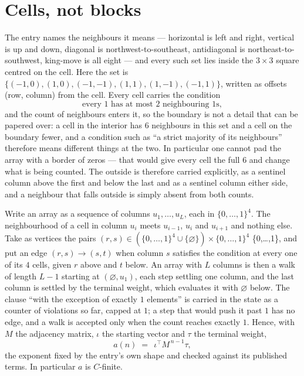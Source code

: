 \documentclass[11pt,a4paper]{article}
\theoremstyle{plain}
\theoremstyle{definition}
\begin{document}
\section{Cells, not blocks}

The entry names the neighbours it means --- horizontal is left and right, vertical is up and
down, diagonal is northwest-to-southeast, antidiagonal is northeast-to-southwest, king-move is
all eight --- and every such set lies inside the $3\times3$ square centred on the cell. Here
the set is $\{(-1,0), (1,0), (-1,-1), (1,1), (1,-1), (-1,1)\}$, written as offsets (row, column) from the cell. Every cell carries
the condition
\[
\text{every 1 has at most 2 neighbouring 1s},
\]
and the count of neighbours enters it, so the boundary is not a detail that can be papered
over: a cell in the interior has $6$ neighbours in this set and a cell on the boundary
fewer, and a condition such as ``a strict majority of its neighbours'' therefore means
different things at the two. In particular one cannot pad the array with a border of zeros ---
that would give every cell the full $6$ and change what is being counted. The outside is
therefore carried
explicitly, as a sentinel column above the first and below the last and as a sentinel column
either side, and a neighbour that falls outside is simply absent from both counts.

Write an array as a sequence of columns $u_1,\dots,u_L$, each in
$\{0,\dots,1\}^{4}$. The neighbourhood of a cell in column $u_i$ meets $u_{i-1}$,
$u_i$ and $u_{i+1}$ and nothing else. Take as vertices the pairs
$(r,s)\in(\{0,\dots,1\}^{4}\cup\{\varnothing\})\times\{0,\dots,1\}^{4}$ \times \{0,\dots,1\},
and put an edge $(r,s)\to(s,t)$ when column $s$ satisfies the condition at every one of its
$4$ cells, given $r$ above and $t$ below. An array with $L$ columns is then a walk of length
$L-1$ starting at $(\varnothing,u_1)$, each step settling one column, and the last column is
settled by the terminal weight, which evaluates it with $\varnothing$ below. The clause ``with the exception of exactly $1$ elements'' is carried in
the state as a counter of violations so far, capped at $1$; a step that would push it past
$1$ has no edge, and a walk is accepted only when the count reaches exactly $1$. Hence,
with $M$ the adjacency matrix, $\iota$ the starting vector and $\tau$ the terminal weight,
\[
a(n)\;=\;\,\iota^{\!\top}M^{\,n-1}\tau ,
\]
the exponent fixed by the entry's own shape and checked against its published terms. In
particular $a$ is $C$-finite.
\end{document}
